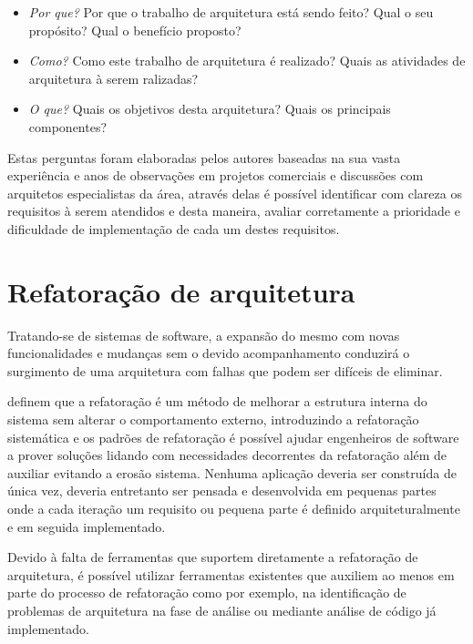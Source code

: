 \begin{itemize}
    \item \textit{Por que?} Por que o trabalho de arquitetura está sendo feito? Qual o seu propósito? Qual o benefício proposto?
    \item \textit{Como?} Como este trabalho de arquitetura é realizado? Quais as atividades de arquitetura à serem ralizadas?
    \item \textit{O que?} Quais os objetivos desta arquitetura? Quais os principais componentes?
\end{itemize}

Estas perguntas foram elaboradas pelos autores baseadas na sua vasta experiência e anos de observações em projetos comerciais e discussões com arquitetos especialistas da área, através delas é possível identificar com clareza os requisitos à serem atendidos e desta maneira, avaliar corretamente a prioridade e dificuldade de implementação de cada um destes requisitos.


\section{Refatoração de arquitetura}

Tratando-se de sistemas de software, a expansão do mesmo com novas funcionalidades e mudanças sem o devido acompanhamento conduzirá o surgimento de uma arquitetura com falhas que podem ser difíceis de eliminar. 

\cite{babar2013agile} definem que a refatoração é um método de melhorar a estrutura interna do sistema sem alterar o comportamento externo, introduzindo a refatoração sistemática e os padrões de refatoração é possível ajudar engenheiros de software a prover soluções lidando com necessidades decorrentes da refatoração além de auxiliar evitando a erosão sistema.
Nenhuma aplicação deveria ser construída de única vez,  deveria entretanto ser pensada e desenvolvida em pequenas partes onde a cada iteração um requisito ou pequena parte é definido arquiteturalmente e em seguida implementado.

Devido à falta de ferramentas que suportem diretamente a refatoração de arquitetura, é possível utilizar ferramentas existentes que auxiliem ao menos em parte do processo de refatoração como por exemplo, na identificação de problemas de arquitetura na fase de análise ou mediante análise de código já implementado.

